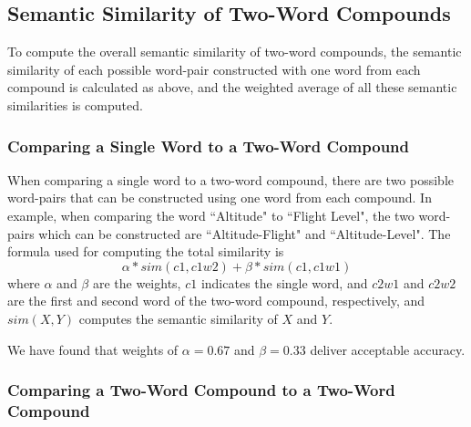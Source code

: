 \documentclass{article}
\begin{document}
\subsection{Semantic Similarity of Two-Word Compounds}

To compute the overall semantic similarity of two-word compounds, the semantic similarity of each possible word-pair constructed with one word from each compound is calculated as above, and the weighted average of all these semantic similarities is computed.



\subsubsection{Comparing a Single Word to a Two-Word Compound}

When comparing a single word to a two-word compound, there are two possible word-pairs that can be constructed using one word from each compound. In example, when comparing the word ``Altitude" to ``Flight Level", the two word-pairs which can be constructed are ``Altitude-Flight" and ``Altitude-Level".
The formula used for computing the total similarity is 
\begin{equation} \label{eq:1wordto2word}
	\alpha * sim(c1, c1w2) + \beta * sim(c1, c1w1)
\end{equation}
where $\alpha$ and $\beta$ are the weights, $c1$ indicates the single word, and $c2w1$ and $c2w2$ are the first and second word of the two-word compound, respectively, and $sim(X,Y)$ computes the semantic similarity of $X$ and $Y$. %

We have found that weights of $\alpha = 0.67$ and $\beta = 0.33$ deliver acceptable accuracy. %

\subsubsection{Comparing a Two-Word Compound to a Two-Word Compound}
\end{document}
